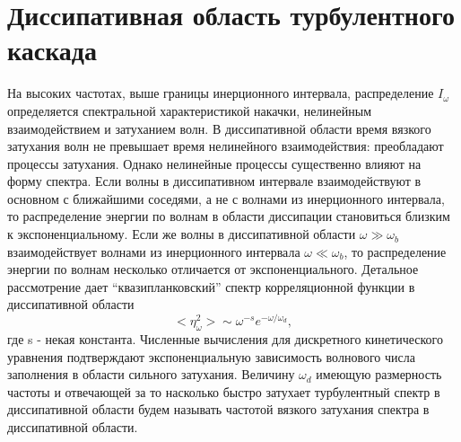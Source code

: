 \section{Диссипативная область турбулентного каскада}%

На высоких частотах, выше границы инерционного интервала, распределение $I_\omega$ определяется спектральной характеристикой накачки, нелинейным взаимодействием и затуханием волн. В диссипативной области время вязкого затухания волн не превышает время нелинейного взаимодействия: преобладают процессы затухания. Однако нелинейные процессы существенно влияют на форму спектра. Если волны в диссипативном интервале взаимодействуют в основном с ближайшими соседями, а не с волнами из инерционного интервала, то распределение энергии по волнам в области диссипации становиться близким к экспоненциальному.
Если же волны в диссипативной области $\omega \gg \omega_b$ взаимодействует волнами из инерционного интервала $\omega \ll \omega_b$, то распределение энергии по волнам несколько отличается от экспоненциального. Детальное рассмотрение дает “квазипланковский” спектр корреляционной функции в диссипативной области  \cite{Ryzhenkova1990}
\begin{equation}
<\eta_\omega^2> \sim \omega^{-s} e^{-\omega/\omega_d},
\end{equation}			
где s - некая константа. Численные вычисления для дискретного кинетического уравнения \cite{Ryzhenkova1990} подтверждают экспоненциальную зависимость волнового числа заполнения в области сильного затухания. Величину $\omega_d$ имеющую размерность частоты и отвечающей за то насколько быстро затухает турбулентный спектр в диссипативной области будем называть частотой вязкого затухания спектра в диссипативной области.
	

%
%

